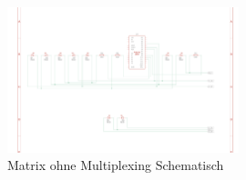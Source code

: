 \begin{figure}[htbp]
	\centering
	\includegraphics[width=0.6\textwidth]{img/LEDMatrixSchaltung}
	\caption{Matrix ohne Multiplexing Schematisch}
	\label{fig:Matrix}
\end{figure}
